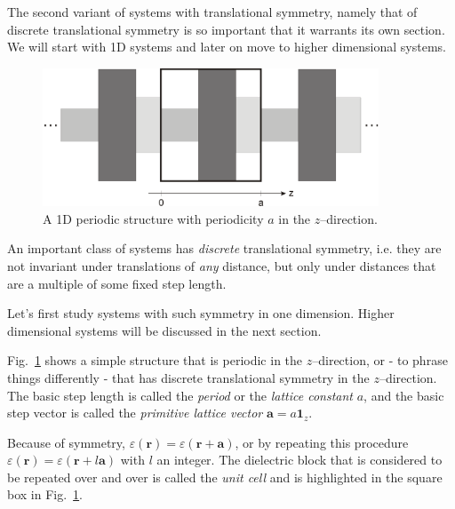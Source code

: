 The second variant of systems with translational symmetry, namely that of discrete translational symmetry is so important that it warrants its own section. We will start with 1D systems and later on move to higher dimensional systems.

\pagebreak


\begin{figure}
\centering
\includegraphics[width=10cm]{symmetry/figures/periodic}
\caption{A 1D periodic structure with periodicity $a$ in the $z$--direction.}
\label{fig-1d-periodic}
\end{figure}

An important class of systems has \emph{discrete} translational symmetry, i.e. they are not invariant under translations of \emph{any} distance, but only under distances that are a multiple of some fixed step length.

Let's first study systems with such symmetry in one dimension. Higher dimensional systems will be discussed in the next section.

Fig.~\ref{fig-1d-periodic} shows a simple structure that is periodic in the $z$--direction, or - to phrase things differently - that has discrete translational symmetry in the $z$--direction. The basic step length is called the \emph{period} or the \emph{lattice constant} $a$, and the basic step vector is called the \emph{primitive lattice vector} ${\mathbf a} = a {\mathbf 1}_z$.



Because of symmetry, $\varepsilon({\mathbf r}) =  \varepsilon({\mathbf r} + {\mathbf a})$, or by repeating this procedure $\varepsilon({\mathbf r}) =  \varepsilon({\mathbf r} + l {\mathbf a})$ with $l$ an integer. The dielectric block that is considered to be repeated over and over is called the \emph{unit cell} and is highlighted in the square box in Fig.~\ref{fig-1d-periodic}. 



